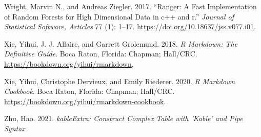 \documentclass[]{elsarticle} %
\newlength{\cslhangindent}
\newenvironment{CSLReferences}[2] %
 {%
  \setlength{\parindent}{0pt}
  \ifodd #1 \everypar{\setlength{\hangindent}{\cslhangindent}}\ignorespaces\fi
  \ifnum #2 > 0
  \setlength{\parskip}{#2\baselineskip}
  \fi
 }%
 {}
\begin{document}
\begin{CSLReferences}{1}{0}
\leavevmode{}%
Wright, Marvin N., and Andreas Ziegler. 2017. {``Ranger: A Fast Implementation of Random Forests for High Dimensional Data in c++ and r.''} \emph{Journal of Statistical Software, Articles} 77 (1): 1--17. \url{https://doi.org/10.18637/jss.v077.i01}.

\leavevmode{}%
Xie, Yihui, J. J. Allaire, and Garrett Grolemund. 2018. \emph{R Markdown: The Definitive Guide}. Boca Raton, Florida: Chapman; Hall/CRC. \url{https://bookdown.org/yihui/rmarkdown}.

\leavevmode{}%
Xie, Yihui, Christophe Dervieux, and Emily Riederer. 2020. \emph{R Markdown Cookbook}. Boca Raton, Florida: Chapman; Hall/CRC. \url{https://bookdown.org/yihui/rmarkdown-cookbook}.

\leavevmode{}%
Zhu, Hao. 2021. \emph{kableExtra: Construct Complex Table with 'Kable' and Pipe Syntax}.

\end{CSLReferences}
\end{document}
